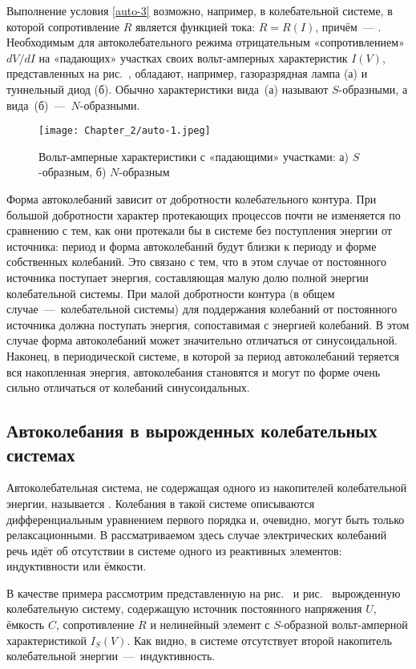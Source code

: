Выполнение условия \eqref{auto-3} возможно, например, в  колебательной системе, в которой сопротивление $R$ является функцией тока: $R=R(I)$, причём~--- . Необходимым для
автоколебательного режима отрицательным «сопротивлением» ${dV}/{dI}$ на «падающих» участках своих вольт-амперных характеристик $I(V)$, представленных на рис.~, обладают, например, газоразрядная лампа (а) и туннельный диод (б). Обычно характеристики вида~(а) называют $S$-образными, а вида~(б)~---~$N$-образными.

\begin{figure}
	\centering
	\texttt{[image: Chapter\_2/auto-1.jpeg]}
	\caption{Вольт-амперные характеристики с «падающими» участками:	а) $S$-образным, б) $N$-образным}
\end{figure}

Форма автоколебаний зависит от добротности колебательного контура. При большой добротности характер протекающих процессов почти не изменяется по сравнению с тем, как они протекали бы в системе без поступления
энергии от источника: период и форма автоколебаний будут близки к периоду и форме собственных колебаний. Это связано с тем, что в этом случае от постоянного источника поступает энергия, составляющая малую
долю полной энергии колебательной системы. При малой добротности контура (в общем случае~---~колебательной системы) для поддержания колебаний от постоянного источника должна поступать энергия, сопоставимая с энергией колебаний. В этом случае форма автоколебаний может значительно отличаться от синусоидальной. Наконец, в периодической системе, в которой за период автоколебаний теряется вся накопленная энергия, автоколебания становятся  и могут по форме очень сильно отличаться от колебаний синусоидальных.

\subsection{Автоколебания в вырожденных колебательных системах}
Автоколебательная система, не содержащая одного из накопителей колебательной энергии, называется . Колебания в такой системе описываются дифференциальным уравнением первого порядка и, очевидно, могут быть только релаксационными. В рассматриваемом здесь случае электрических колебаний речь идёт об отсутствии в системе одного из реактивных элементов: индуктивности или ёмкости.

В качестве примера рассмотрим представленную на рис.~ и рис.~ вырожденную колебательную систему, содержащую источник постоянного напряжения $U$, ёмкость $C$, сопротивление $R$ и нелинейный элемент с $S$-образной вольт-амперной характеристикой $I_S(V)$. Как видно, в системе отсутствует второй накопитель колебательной энергии~---~индуктивность.

